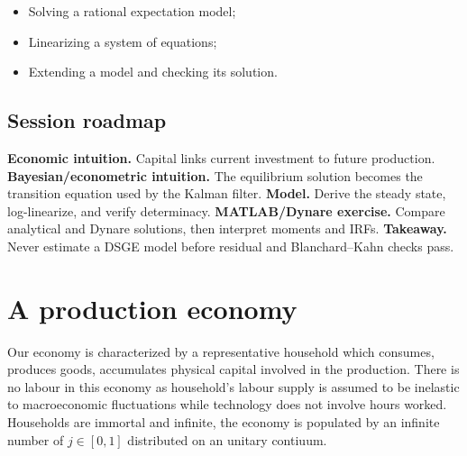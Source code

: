 \documentclass[a4paper,12pt]{article}%
\begin{document}
\FRONTPAGE%

\vspace{4ex}
\begin{myobjs}%


\begin{itemize}
\item Solving a rational expectation model;

\item Linearizing a system of equations;

\item Extending a model and checking its solution.
\end{itemize}

%

\end{myobjs}%

\subsection*{Session roadmap}
\textbf{Economic intuition.} Capital links current investment to future
production. \textbf{Bayesian/econometric intuition.} The equilibrium solution
becomes the transition equation used by the Kalman filter. \textbf{Model.}
Derive the steady state, log-linearize, and verify determinacy.
\textbf{MATLAB/Dynare exercise.} Compare analytical and Dynare solutions, then
interpret moments and IRFs. \textbf{Takeaway.} Never estimate a DSGE model
before residual and Blanchard--Kahn checks pass.


\newpage

\section{A production economy}

Our economy is characterized by a representative household which consumes,
produces goods, accumulates physical capital involved in the production. There
is no labour in this economy as household's labour supply is assumed to be
inelastic to macroeconomic fluctuations while technology does not involve
hours worked. Households are immortal and infinite, the economy is populated
by an infinite number of $j\in\left[  0,1\right]  $ distributed on an unitary contiuum.
\end{document}
